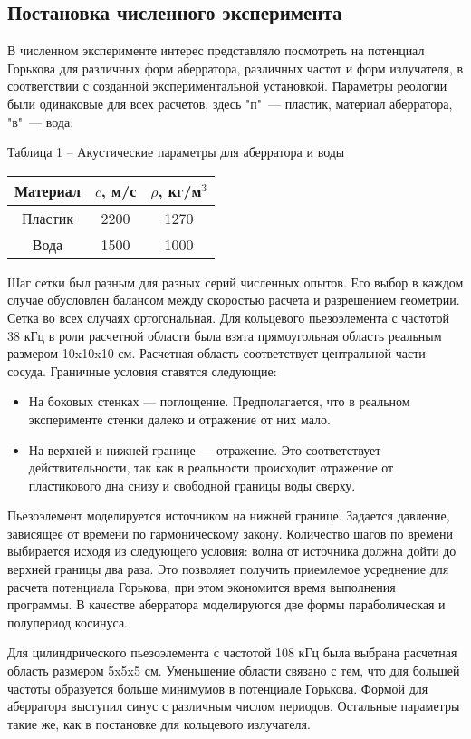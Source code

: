 \subsection{Постановка численного эксперимента}
В численном эксперименте интерес представляло посмотреть на потенциал Горькова для различных форм аберратора, различных частот и форм излучателя, в соответствии с созданной экспериментальной установкой. Параметры реологии были одинаковые для всех расчетов, здесь "п"\ --- пластик, материал аберратора, "в"\ --- вода:
\begin{table}[H]
	\noindent Таблица 1 – Акустические параметры для аберратора и воды
	
	\begin{center}
		\begin{tabular}{|c|c|c|}
			\hline
			Материал & $c$, м/с & $\rho$, кг/м$^3$ \\
			\hline
			Пластик & 2200 & 1270 \\
			Вода & 1500 & 1000 \\
			\hline
		\end{tabular}
	\end{center}
\end{table}
Шаг сетки был разным для разных серий численных опытов. Его выбор в каждом случае обусловлен балансом между скоростью расчета и разрешением геометрии. Сетка во всех случаях ортогональная. Для кольцевого пьезоэлемента с частотой 38 кГц в роли расчетной области была взята прямоугольная область реальным размером 10x10x10 см. Расчетная область соответствует центральной части сосуда. Граничные условия ставятся следующие:
\begin{itemize}
	\item На боковых стенках --- поглощение. Предполагается, что в реальном эксперименте стенки далеко и отражение от них мало.
	\item На верхней и нижней границе --- отражение. Это соответствует действительности, так как в реальности происходит отражение от пластикового дна снизу и свободной границы воды сверху.
\end{itemize}
Пьезоэлемент моделируется источником на нижней границе. Задается давление, зависящее от времени по гармоническому закону. Количество шагов по времени выбирается исходя из следующего условия: волна от источника должна дойти до верхней границы два раза. Это позволяет получить приемлемое усреднение для расчета потенциала Горькова, при этом экономится время выполнения программы. В качестве аберратора моделируются две формы параболическая и полупериод косинуса.

Для цилиндрического пьезоэлемента с частотой 108 кГц была выбрана расчетная область размером 5x5x5 см. Уменьшение области связано с тем, что для большей частоты образуется больше минимумов в потенциале Горькова. Формой для аберратора выступил синус с различным числом периодов. Остальные параметры такие же, как в постановке для кольцевого излучателя.



\newpage
